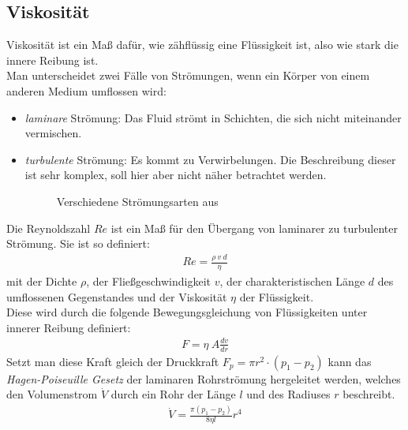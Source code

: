 \documentclass[12pt,a4paper,titlepage,headinclude,bibtotoc]{scrartcl}
\begin{document}
\subsection{Viskosität}
Viskosität ist ein Maß dafür, wie zähflüssig eine Flüssigkeit ist, also wie stark die innere Reibung ist.\\
Man unterscheidet zwei Fälle von Strömungen, wenn ein Körper von einem anderen Medium  umflossen wird:
\begin{itemize}
	\item \textit{laminare} Strömung: Das Fluid strömt in Schichten, die sich nicht miteinander vermischen. %
	\item \textit{turbulente} Strömung: Es kommt zu Verwirbelungen. Die Beschreibung dieser ist sehr komplex, soll hier aber nicht näher betrachtet werden.
\begin{figure}[htb]
  \centering
  \hfill
  \caption{Verschiedene Strömungsarten aus \cite[S. 465]{giancoli}}
  \label{fig:label-gesamt}
\end{figure}
\end{itemize}
Die Reynoldszahl $Re$ ist ein Maß für den Übergang von laminarer zu turbulenter Strömung.
Sie ist so definiert:
\begin{align}
	Re=\frac{\rho~v~d}{\eta}
\end{align}
mit der Dichte $\rho$, der Fließgeschwindigkeit $v$, der charakteristischen Länge $d$ des umflossenen Gegenstandes und der Viskosität $\eta$ der Flüssigkeit.\\
Diese wird durch die folgende Bewegungsgleichung von Flüssigkeiten unter innerer Reibung definiert:
\begin{align}
	F=\eta~ A\frac{dv}{dr}
\end{align}
Setzt man diese Kraft gleich der Druckkraft $F_p=\pi r^2 \cdot (p_1-p_2)$ kann das \textit{Hagen-Poiseuille Gesetz} der laminaren Rohrströmung hergeleitet werden, welches den Volumenstrom $\dot V$ durch ein Rohr der Länge $l$ und des Radiuses $r$ beschreibt.\cite[S.125]{gerthsen} %
\begin{align}
	\dot{V}=\frac{\pi(p_1-p_2)}{8\eta l}r^4\label{eq:eta1}
\end{align}
\end{document}
